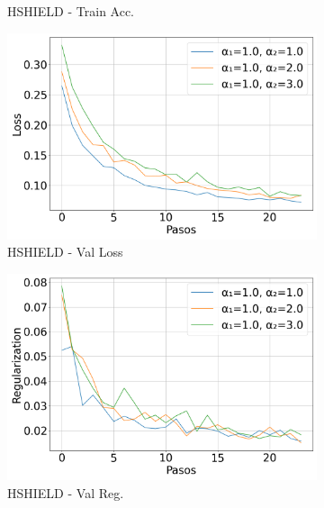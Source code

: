 \begin{figure}[H]
\begin{subfigure}[b]{0.3\textwidth}
        \caption{HSHIELD - Train Acc.}
    \end{subfigure}

    \vspace{0.5em}

    \begin{subfigure}[b]{0.3\textwidth}
        \includegraphics[width=\linewidth]{images/Val_Loss_evolucion_hshield.png}
        \caption{HSHIELD - Val Loss}
    \end{subfigure}
    \hfill
    \begin{subfigure}[b]{0.3\textwidth}
        \includegraphics[width=\linewidth]{images/Val_Regularization_evolucion_hshield.png}
        \caption{HSHIELD - Val Reg.}
    \end{subfigure}
    \hfill
    \begin{subfigure}[b]{0.3\textwidth}

\end{subfigure}
\end{figure}
